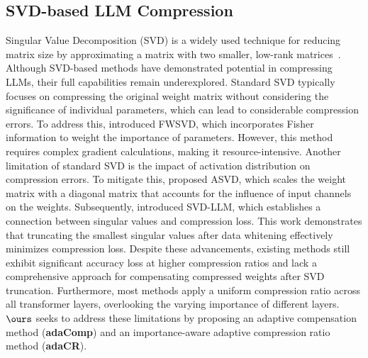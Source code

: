 	
	
	\vspace{-1.2mm}
	\subsection{SVD-based LLM Compression}
	\vspace{-1.2mm}
	Singular Value Decomposition (SVD) is a widely used technique for reducing matrix size by approximating a matrix with two smaller, low-rank matrices~\cite{GOLUB1987317}. Although SVD-based methods have demonstrated potential in compressing LLMs, their full capabilities remain underexplored. Standard SVD typically focuses on compressing the original weight matrix without considering the significance of individual parameters, which can lead to considerable compression errors. To address this, \citet{hsu2022languagemodel} introduced FWSVD, which incorporates Fisher information to weight the importance of parameters. However, this method requires complex gradient calculations, making it resource-intensive. Another limitation of standard SVD is the impact of activation distribution on compression errors. To mitigate this, \citet{yuan2024asvd} proposed ASVD, which scales the weight matrix with a diagonal matrix that accounts for the influence of input channels on the weights. Subsequently, \citet{wang2024svdllm} introduced SVD-LLM, which establishes a connection between singular values and compression loss. This work demonstrates that truncating the smallest singular values after data whitening effectively minimizes compression loss. Despite these advancements, existing methods still exhibit significant accuracy loss at higher compression ratios and lack a comprehensive approach for compensating compressed weights after SVD truncation. Furthermore, most methods apply a uniform compression ratio across all transformer layers, overlooking the varying importance of different layers. $\ours$ seeks to address these limitations by proposing an adaptive compensation method (\textbf{adaComp}) and an importance-aware adaptive compression ratio method (\textbf{adaCR}).
	
	
	\vspace{-2.5mm}